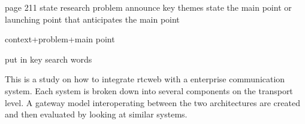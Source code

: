 
page 211
state research problem
announce key themes
state the main point or launching point that anticipates the main point

context+problem+main point

put in key search words

\begin{abstract}


\end{abstract}


This is a study on how to integrate \gls{rtcweb} with a enterprise communication system. Each system is broken down into several components on the transport level. A gateway model interoperating between the two architectures are created and then evaluated by looking at similar systems.

